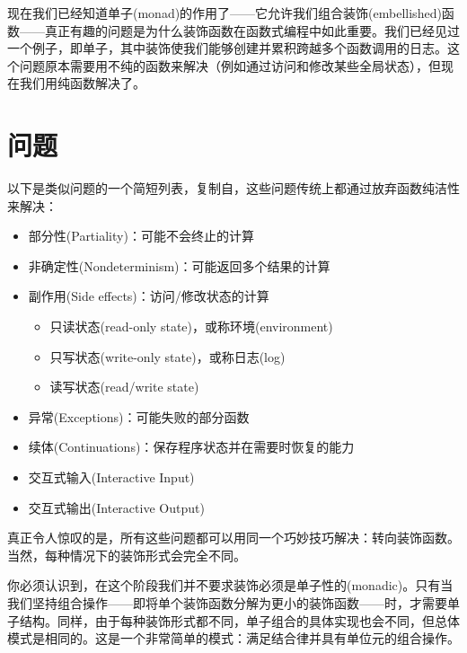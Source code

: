 
\lettrine[lhang=0.17]{现}{在我们已经知道}单子(monad)的作用了——它允许我们组合装饰(embellished)函数——真正有趣的问题是为什么装饰函数在函数式编程中如此重要。我们已经见过一个例子，即单子，其中装饰使我们能够创建并累积跨越多个函数调用的日志。这个问题原本需要用不纯的函数来解决（例如通过访问和修改某些全局状态），但现在我们用纯函数解决了。

\section{问题}

以下是类似问题的一个简短列表，复制自，这些问题传统上都通过放弃函数纯洁性来解决：

\begin{itemize}
  \tightlist
  \item
        部分性(Partiality)：可能不会终止的计算
  \item
        非确定性(Nondeterminism)：可能返回多个结果的计算
  \item
        副作用(Side effects)：访问/修改状态的计算

        \begin{itemize}
          \tightlist
          \item
                只读状态(read-only state)，或称环境(environment)
          \item
                只写状态(write-only state)，或称日志(log)
          \item
                读写状态(read/write state)
        \end{itemize}
  \item
        异常(Exceptions)：可能失败的部分函数
  \item
        续体(Continuations)：保存程序状态并在需要时恢复的能力
  \item
        交互式输入(Interactive Input)
  \item
        交互式输出(Interactive Output)
\end{itemize}

真正令人惊叹的是，所有这些问题都可以用同一个巧妙技巧解决：转向装饰函数。当然，每种情况下的装饰形式会完全不同。

你必须认识到，在这个阶段我们并不要求装饰必须是单子性的(monadic)。只有当我们坚持组合操作——即将单个装饰函数分解为更小的装饰函数——时，才需要单子结构。同样，由于每种装饰形式都不同，单子组合的具体实现也会不同，但总体模式是相同的。这是一个非常简单的模式：满足结合律并具有单位元的组合操作。

